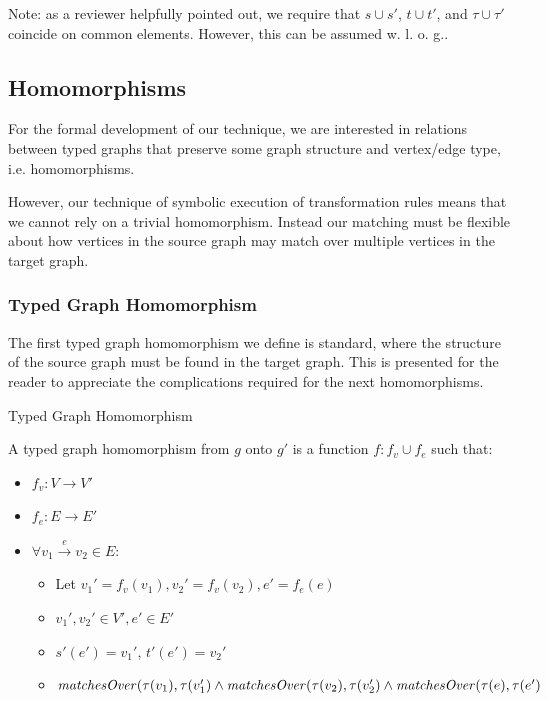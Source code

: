 Note: as a reviewer helpfully pointed out, we require that $s \cup s'$, $t \cup t'$, and $\tau \cup \tau'$ coincide on common elements. However, this can be assumed w. l. o. g..




\subsection{Homomorphisms}
\label{subsec:homomorphisms}

For the formal development of our technique, we are interested in relations between typed graphs that preserve some graph structure and vertex/edge type, i.e. homomorphisms.

However, our technique of symbolic execution of transformation rules means that we cannot rely on a trivial homomorphism. Instead our matching must be flexible about how vertices in the source graph may match over multiple vertices in the target graph.

\subsubsection*{Typed Graph Homomorphism}

The first typed graph homomorphism we define is standard, where the structure of the source graph must be found in the target graph. This is presented for the reader to appreciate the complications required for the next homomorphisms.

\begin{definition}{Typed Graph Homomorphism\\}
\label{def:typed_graph_homomorphism}

A typed graph homomorphism from $g$ onto $g'$ is a function $f: f_v \cup f_e$ such that:
\begin{itemize}
\item $f_v: V\rightarrow V'$
\item $f_e: E\rightarrow E'$
\item $\forall v_1 \xrightarrow{e} v_2\in E$:
\begin{itemize}
\item Let $ v_1' = f_v(v_1), v_2' = f_v(v_2), e' = f_e(e)$
\item $v_1', v_2' \in V', e' \in E'$
\item $s'(e') = v_1'$, $t'(e') = v_2'$
\item $\mathit{matchesOver}(\tau(v_1), \tau(v_1') \land \\\mathit{matchesOver}(\tau(v_2), \tau(v_2') \land\\ \mathit{matchesOver}(\tau(e), \tau(e')$
\end{itemize}

\end{itemize}  
\end{definition}

